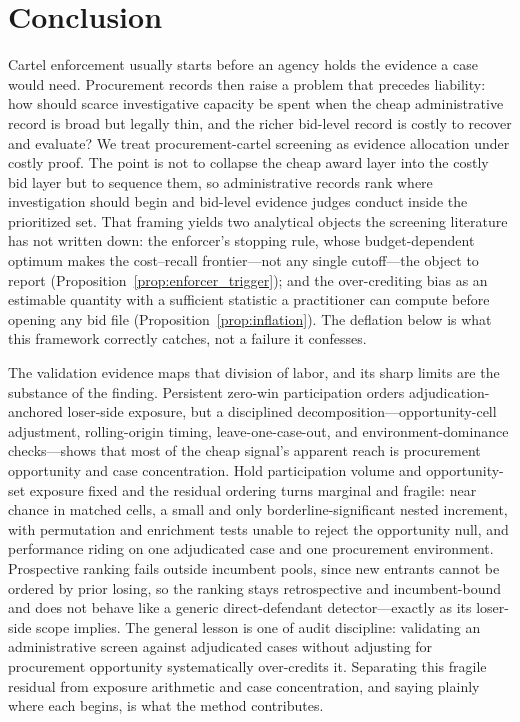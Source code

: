 \section{Conclusion}
\label{sec:conclusion}

Cartel enforcement usually starts before an agency holds the
evidence a case would need. Procurement records then raise a problem
that precedes liability: how should scarce investigative capacity be
spent when the cheap administrative record is broad but legally thin,
and the richer bid-level record is costly to recover and evaluate?
We treat procurement-cartel screening as evidence allocation under
costly proof. The point is not to collapse the cheap award layer into
the costly bid layer but to sequence them, so administrative records
rank where investigation should begin and bid-level evidence judges
conduct inside the prioritized set. That framing yields two analytical
objects the screening literature has not written down: the enforcer's
stopping rule, whose budget-dependent optimum makes the cost--recall
frontier---not any single cutoff---the object to report
(Proposition~\ref{prop:enforcer_trigger}); and the over-crediting bias
as an estimable quantity with a sufficient statistic a practitioner can
compute before opening any bid file
(Proposition~\ref{prop:inflation}). The deflation below is what this
framework correctly catches, not a failure it confesses.

%
The validation evidence maps that division of labor, and its sharp
limits are the substance of the finding. Persistent zero-win
participation orders adjudication-anchored loser-side exposure, but a
disciplined decomposition---opportunity-cell adjustment, rolling-origin
timing, leave-one-case-out, and environment-dominance checks---shows
that most of the cheap signal's apparent reach is procurement
opportunity and case concentration. Hold participation volume and
opportunity-set exposure fixed and the residual ordering turns marginal
and fragile: near chance in matched cells, a small and only
borderline-significant nested increment, with permutation and
enrichment tests unable to reject the opportunity null, and performance
riding on one adjudicated case and one procurement environment.
Prospective ranking fails outside incumbent pools, since new entrants
cannot be ordered by prior losing, so the ranking stays retrospective
and incumbent-bound and does not behave like a generic
direct-defendant detector---exactly as its loser-side scope implies.
The general lesson is one of audit discipline: validating an
administrative screen against adjudicated cases without adjusting for
procurement opportunity systematically over-credits it. Separating this
fragile residual from exposure arithmetic and case concentration, and
saying plainly where each begins, is what the method contributes.


